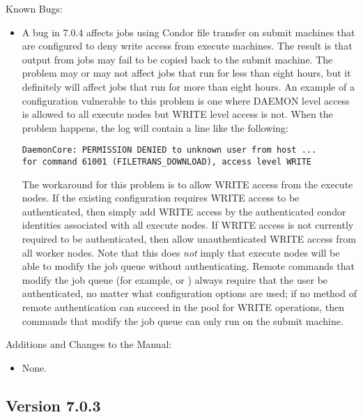 \noindent Known Bugs:

\begin{itemize}

\item A bug in 7.0.4 affects jobs using Condor file transfer on submit
machines that are configured to deny write access from execute
machines.  The result is that output from jobs may fail to be copied
back to the submit machine.  The problem may or may not affect jobs
that run for less than eight hours, but it definitely will affect jobs
that run for more than eight hours.  An example of a configuration
vulnerable to this problem is one where DAEMON level access is allowed
to all execute nodes but WRITE level access is not.  When the problem
happens, the  log will contain a line like the following:

\begin{verbatim}
DaemonCore: PERMISSION DENIED to unknown user from host ...
for command 61001 (FILETRANS_DOWNLOAD), access level WRITE
\end{verbatim}

The workaround for this problem is to allow WRITE access from the
execute nodes.  If the existing configuration requires WRITE access to
be authenticated, then simply add WRITE access by the authenticated
condor identities associated with all execute nodes.  If WRITE access
is not currently required to be authenticated, then allow
unauthenticated WRITE access from all worker nodes.  Note that this
does \emph{not} imply that execute nodes will be able to modify the
job queue without authenticating.  Remote commands that modify the job
queue (for example,  or ) always require that the
user be authenticated, no matter what configuration options are used;
if no method of remote authentication can succeed in the pool for
WRITE operations, then commands that modify the job queue can only run
on the submit machine.

\end{itemize}

\noindent Additions and Changes to the Manual:

\begin{itemize}

\item None.

\end{itemize}

\subsection*{\label{sec:New-7-0-3}Version 7.0.3}

